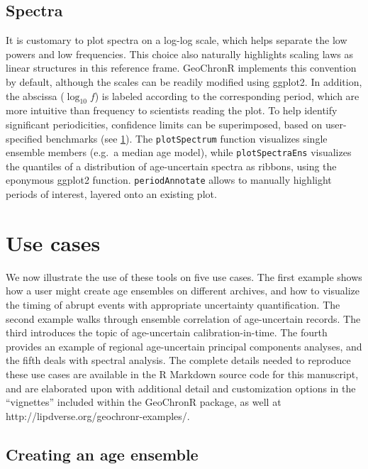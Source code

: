 \documentclass[gchron, manuscript]{copernicus}
\begin{document}
\hypertarget{sec:spec_viz}{%
\subsection{Spectra}\label{sec:spec_viz}}

It is customary to plot spectra on a log-log scale, which helps separate the low powers and low frequencies.
This choice also naturally highlights scaling laws \citep{lovejoy2013weather, ZhuPNAS2019} as linear structures in this reference frame.
GeoChronR implements this convention by default, although the scales can be readily modified using ggplot2.
In addition, the abscissa (\(\log_{10} f\)) is labeled according to the corresponding period, which are more intuitive than frequency to scientists reading the plot.
To help identify significant periodicities, confidence limits can be superimposed, based on user-specified benchmarks (see \ref{sec:use-cases}).
The \texttt{plotSpectrum} function visualizes single ensemble members (e.g.~a median age model), while \texttt{plotSpectraEns} visualizes the quantiles of a distribution of age-uncertain spectra as ribbons, using the eponymous ggplot2 function.
\texttt{periodAnnotate} allows to manually highlight periods of interest, layered onto an existing plot.

\hypertarget{sec:use-cases}{%
\section{Use cases}\label{sec:use-cases}}

We now illustrate the use of these tools on five use cases.
The first example shows how a user might create age ensembles on different archives, and how to visualize the timing of abrupt events with appropriate uncertainty quantification.
The second example walks through ensemble correlation of age-uncertain records.
The third introduces the topic of age-uncertain calibration-in-time.
The fourth provides an example of regional age-uncertain principal components analyses, and the fifth deals with spectral analysis.
The complete details needed to reproduce these use cases are available in the R Markdown source code for this manuscript, and are elaborated upon with additional detail and customization options in the ``vignettes'' included within the GeoChronR package, as well at http://lipdverse.org/geochronr-examples/.

\hypertarget{sec:create_age}{%
\subsection{Creating an age ensemble}\label{sec:create_age}}
\end{document}

